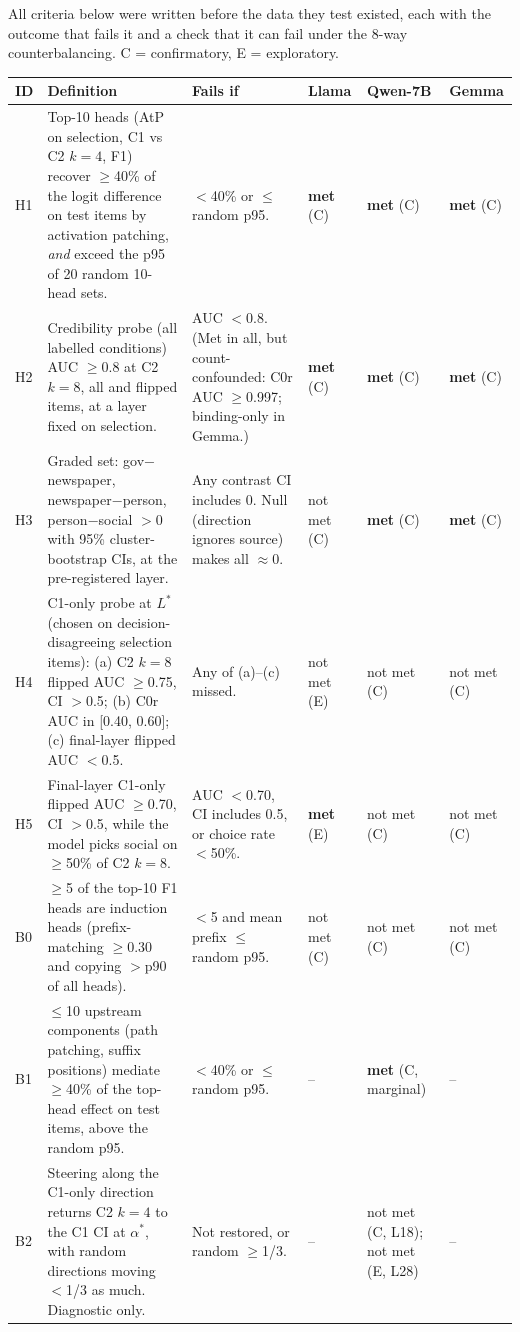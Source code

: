 All criteria below were written before the data they test existed, each with the outcome that fails it and a check that it can fail under the 8-way counterbalancing. C = confirmatory, E = exploratory.

\begin{table}[!htbp]\centering\scriptsize
\begin{tabular}{@{}p{1.1cm}p{5.6cm}p{4.1cm}p{1.15cm}p{1.15cm}p{1.15cm}@{}}\toprule
ID & Definition & Fails if & Llama & Qwen-7B & Gemma \\ \midrule
H1 & Top-10 heads (AtP on selection, C1 vs C2 $k{=}4$, F1) recover $\ge$40\% of the logit difference on test items by activation patching, \emph{and} exceed the p95 of 20 random 10-head sets. & $<$40\% or $\le$ random p95. & \textbf{met} (C) & \textbf{met} (C) & \textbf{met} (C) \\
H2 & Credibility probe (all labelled conditions) AUC $\ge$0.8 at C2 $k{=}8$, all and flipped items, at a layer fixed on selection. & AUC $<$0.8. (Met in all, but count-confounded: C0r AUC $\ge$0.997; binding-only in Gemma.) & \textbf{met} (C) & \textbf{met} (C) & \textbf{met} (C) \\
H3 & Graded set: gov$-$newspaper, newspaper$-$person, person$-$social $>0$ with 95\% cluster-bootstrap CIs, at the pre-registered layer. & Any contrast CI includes 0. Null (direction ignores source) makes all $\approx0$. & not met (C) & \textbf{met} (C) & \textbf{met} (C) \\
H4 & C1-only probe at $L^*$ (chosen on decision-disagreeing selection items): (a) C2 $k{=}8$ flipped AUC $\ge$0.75, CI $>$0.5; (b) C0r AUC in [0.40, 0.60]; (c) final-layer flipped AUC $<$0.5. & Any of (a)--(c) missed. & not met (E) & not met (C) & not met (C) \\
H5 & Final-layer C1-only flipped AUC $\ge$0.70, CI $>$0.5, while the model picks social on $\ge$50\% of C2 $k{=}8$. & AUC $<$0.70, CI includes 0.5, or choice rate $<$50\%. & \textbf{met} (E) & not met (C) & not met (C) \\
B0 & $\ge$5 of the top-10 F1 heads are induction heads (prefix-matching $\ge$0.30 and copying $>$p90 of all heads). & $<$5 and mean prefix $\le$ random p95. & not met (C) & not met (C) & not met (C) \\
B1 & $\le$10 upstream components (path patching, suffix positions) mediate $\ge$40\% of the top-head effect on test items, above the random p95. & $<$40\% or $\le$ random p95. & -- & \textbf{met} (C, marginal) & -- \\
B2 & Steering along the C1-only direction returns C2 $k{=}4$ to the C1 CI at $\alpha^*$, with random directions moving $<$1/3 as much. Diagnostic only. & Not restored, or random $\ge$1/3. & -- & not met (C, L18); not met (E, L28) & -- \\

\end{tabular}
\end{table}
